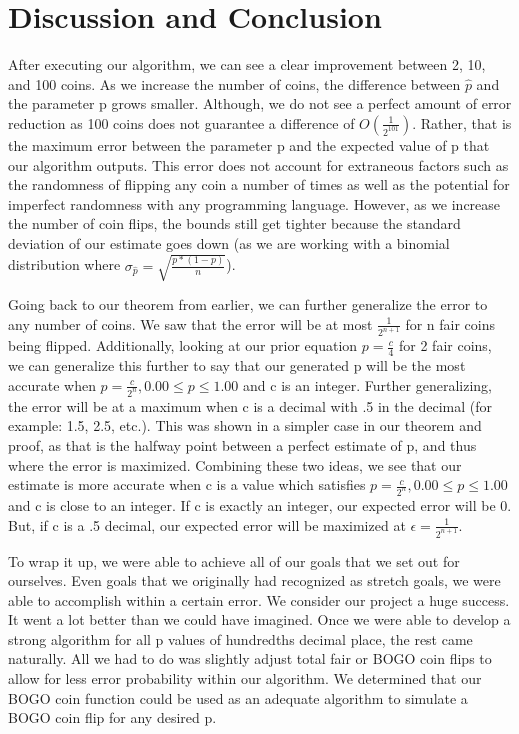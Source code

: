 \documentclass[11pt]{article}
\begin{document}
\section*{Discussion and Conclusion}
\quad After executing our algorithm, we can see a clear improvement between 2, 10, and 100 coins. As we 
increase the number of coins, the difference between $\hat{p}$ and the parameter p grows smaller. Although, we do not see a 
perfect amount of error reduction as 100 coins does not guarantee a difference of $O(\frac{1}{2^{101}})$.
Rather, that is the maximum error between the parameter p and the expected value of p that our algorithm 
outputs. This error does not account for extraneous factors such as the randomness of flipping any coin a 
number of times as well as the potential for imperfect randomness with any programming language. However, 
as we increase the number of coin flips, the bounds still get tighter because the standard deviation of 
our estimate goes down (as we are working with a binomial distribution where $\sigma_{\hat{p}}=\sqrt{\frac{p*(1-p)}{n}}$).

Going back to our theorem from earlier, we can further generalize the error to any number of coins. 
We saw that the error will be at most $\frac{1}{2^{n+1}}$ for n fair coins being flipped. Additionally,
looking at our prior equation $p = \frac{c}{4}$ for 2 fair coins, we can generalize this further to say 
that our generated p will be the most accurate when $p=\frac{c}{2^n}, 0.00 \leq p \leq 1.00$ and c is 
an integer. Further generalizing, the error will be at a maximum when c is a decimal with .5 in the 
decimal (for example: 1.5, 2.5, etc.). This was shown in a simpler case in our theorem and proof, as that is the halfway point between 
a perfect estimate of p, and thus where the error is maximized. Combining these two ideas, we see 
that our estimate is more accurate when c is a value which satisfies $p=\frac{c}{2^n}, 0.00 \leq p \leq 1.00$ 
and c is close to an integer. If c is exactly an integer, our expected error will be 0. But, if 
c is a .5 decimal, our expected error will be maximized at $\epsilon = \frac{1}{2^{n+1}}$.

To wrap it up, we were able to achieve all of our goals that we set out for ourselves. Even goals that
we originally had recognized as stretch goals, we were able to accomplish within a certain error.
We consider our project a huge success. It went a lot better than we could have imagined. Once we were
able to develop a strong algorithm for all p values of hundredths decimal place, the rest came naturally.
All we had to do was slightly adjust total fair or BOGO coin flips to allow for less error probability
within our algorithm. We determined that our BOGO coin function could be used as an adequate algorithm to 
simulate a BOGO coin flip for any desired p.
\end{document}
